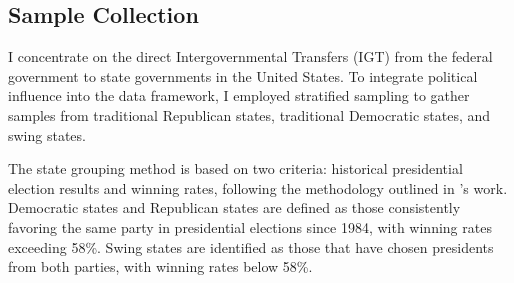 \documentclass[man]{apa7}
\begin{document}


\subsection{Sample Collection}


I concentrate on the direct Intergovernmental Transfers (IGT) from the federal government to state governments in the United States. To integrate political influence into the data framework, I employed stratified sampling to gather samples from traditional Republican states, traditional Democratic states, and swing states.%


The state grouping method is based on two criteria: historical presidential election results and winning rates, following the methodology outlined in \Textcite{beachler2015presidential}'s work. Democratic states and Republican states are defined as those consistently favoring the same party in presidential elections since 1984, with winning rates exceeding 58\%. Swing states are identified as those that have chosen presidents from both parties, with winning rates below 58\%.%
\end{document}
